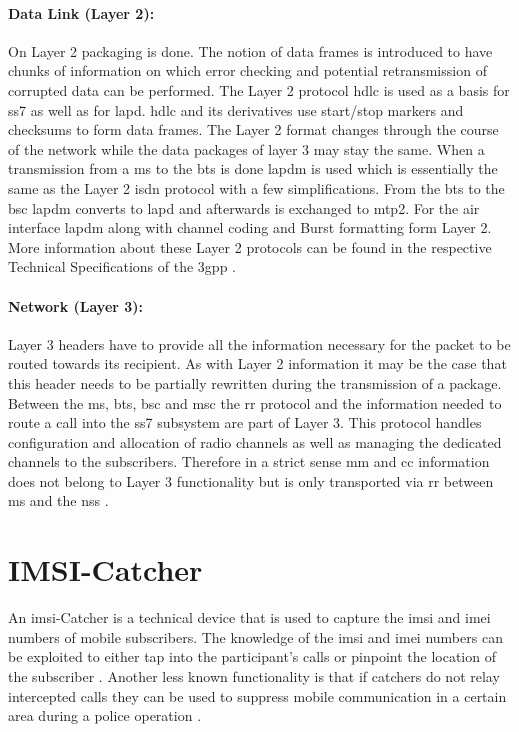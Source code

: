 \paragraph{Data Link (Layer 2):} On Layer 2 packaging is done.
The notion of data frames is introduced to have chunks of information on which error checking and potential retransmission of corrupted data can be performed.
The Layer 2 protocol \gls{hdlc} is used as a basis for \gls{ss7} as well as for \gls{lapd}.
\gls{hdlc} and its derivatives use start/stop markers and checksums to form data frames.
The Layer 2 format changes through the course of the network while the data packages of layer 3 may stay the same.
When a transmission from a \gls{ms} to the \gls{bts} is done \gls{lapdm} is used which is essentially the same as the Layer 2 \gls{isdn} protocol with a few simplifications.
From the \gls{bts} to the \gls{bsc} \gls{lapdm} converts to \gls{lapd} and afterwards is exchanged to \gls{mtp2}.
For the air interface \gls{lapdm} along with channel coding and Burst formatting form Layer 2.
More information about these Layer 2 protocols can be found in the respective Technical Specifications of the \gls{3gpp} \cite{GSM0405,GSM0406}.

\paragraph{Network (Layer 3):} Layer 3 headers have to provide all the information necessary for the packet to be routed towards its recipient.
As with Layer 2 information it may be the case that this header needs to be partially rewritten during the transmission of a package.
Between the \gls{ms}, \gls{bts}, \gls{bsc} and \gls{msc} the \gls{rr} protocol and the information needed to route a call into the \gls{ss7} subsystem are part of Layer 3.
This protocol handles configuration and allocation of radio channels as well as managing the dedicated channels to the subscribers.
Therefore in a strict sense \gls{mm} and \gls{cc} information does not belong to Layer 3 functionality but is only transported via \gls{rr} between \gls{ms} and the \gls{nss} \cite{protocols1999}.

\section{IMSI-Catcher}
\label{sec:catcher}
An \gls{imsi}-Catcher is a technical device that is used to capture the \gls{imsi} and \gls{imei} numbers of mobile subscribers.
The knowledge of the \gls{imsi} and \gls{imei} numbers can be exploited to either tap into the participant's calls or pinpoint the location of the subscriber \cite{fox}.
Another less known functionality is that if catchers do not relay intercepted calls they can be used to suppress mobile communication in a certain area \eg during a police operation \cite{imsi_wiki}.

